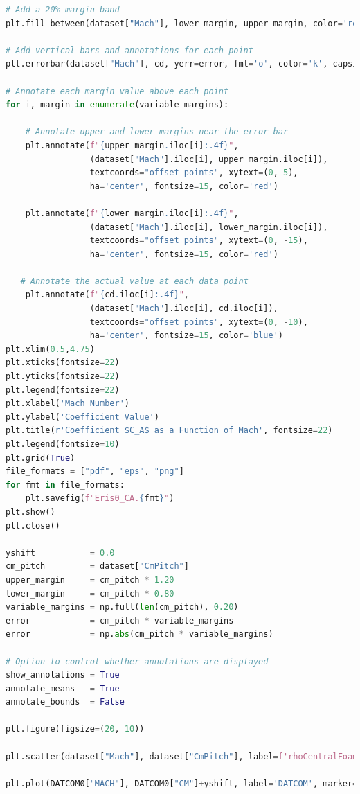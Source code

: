 \documentclass[12pt]{article}
\begin{document}
\begin{lstlisting}[language=Python, caption=Python script used to post-process numerical solutions. To report bugs email to: lorenzo.campoli@gspace.com, label=lst:pp]
# Add a 20% margin band 
plt.fill_between(dataset["Mach"], lower_margin, upper_margin, color='red', alpha=0.2, label='20% Margin Band')

# Add vertical bars and annotations for each point
plt.errorbar(dataset["Mach"], cd, yerr=error, fmt='o', color='k', capsize=10, label='Local Margin')

# Annotate each margin value above each point
for i, margin in enumerate(variable_margins):

    # Annotate upper and lower margins near the error bar
    plt.annotate(f"{upper_margin.iloc[i]:.4f}", 
                 (dataset["Mach"].iloc[i], upper_margin.iloc[i]), 
                 textcoords="offset points", xytext=(0, 5),
                 ha='center', fontsize=15, color='red')
    
    plt.annotate(f"{lower_margin.iloc[i]:.4f}", 
                 (dataset["Mach"].iloc[i], lower_margin.iloc[i]), 
                 textcoords="offset points", xytext=(0, -15),
                 ha='center', fontsize=15, color='red')

   # Annotate the actual value at each data point
    plt.annotate(f"{cd.iloc[i]:.4f}", 
                 (dataset["Mach"].iloc[i], cd.iloc[i]), 
                 textcoords="offset points", xytext=(0, -10),
                 ha='center', fontsize=15, color='blue')
plt.xlim(0.5,4.75)
plt.xticks(fontsize=22)
plt.yticks(fontsize=22)
plt.legend(fontsize=22)
plt.xlabel('Mach Number')
plt.ylabel('Coefficient Value')
plt.title(r'Coefficient $C_A$ as a Function of Mach', fontsize=22)
plt.legend(fontsize=10)
plt.grid(True)
file_formats = ["pdf", "eps", "png"]
for fmt in file_formats:
    plt.savefig(f"Eris0_CA.{fmt}")
plt.show()
plt.close()

yshift           = 0.0
cm_pitch         = dataset["CmPitch"]
upper_margin     = cm_pitch * 1.20  
lower_margin     = cm_pitch * 0.80 
variable_margins = np.full(len(cm_pitch), 0.20)
error            = cm_pitch * variable_margins
error            = np.abs(cm_pitch * variable_margins) 

# Option to control whether annotations are displayed
show_annotations = True  
annotate_means   = True   
annotate_bounds  = False  

plt.figure(figsize=(20, 10))

plt.scatter(dataset["Mach"], dataset["CmPitch"], label=f'rhoCentralFoam', s=200, marker='p', color='g', linestyle='dotted')

plt.plot(DATCOM0["MACH"], DATCOM0["CM"]+yshift, label='DATCOM', marker='p', linestyle=':', color='gray')


\end{lstlisting}
\end{document}
